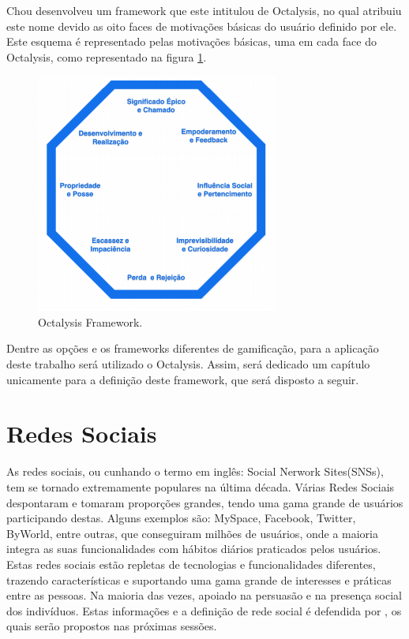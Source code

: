 Chou desenvolveu um framework que este intitulou de Octalysis, no qual atribuiu
este nome devido as oito faces de motivações básicas do usuário definido por ele.
Este esquema é representado pelas motivações básicas, uma em cada face do Octalysis,
como representado na figura \ref{fig:octalysisex}.

\begin{figure}[h]
    \centering
    \includegraphics[width=300px, scale=1]{figuras/octalysisex}
    \caption{Octalysis Framework.}
    \label{fig:octalysisex}
\end{figure}

Dentre as opções e os frameworks diferentes de gamificação, para a aplicação
deste trabalho será utilizado o Octalysis. Assim, será dedicado um capítulo
unicamente para a definição deste framework, que será disposto a seguir.



\section{Redes Sociais}
\label{sec:redessociais}
As redes sociais, ou cunhando o termo em inglês: Social Nerwork Sites(SNSs),
tem se tornado extremamente populares na última década. 
Várias
Redes Sociais despontaram e tomaram proporções grandes, tendo uma gama grande
de usuários participando destas. Alguns exemplos são: MySpace, Facebook, Twitter,
ByWorld, entre outras, que conseguiram milhões de usuários, onde a maioria integra
as suas funcionalidades com hábitos diários praticados pelos usuários.
Estas redes sociais estão repletas de tecnologias e funcionalidades diferentes,
trazendo características e suportando uma gama grande de interesses e práticas
entre as pessoas. Na maioria das vezes, apoiado na persuasão e na presença social
dos indivíduos. Estas informações e a definição de rede social é defendida por
\cite{socialnetworkdefinition}, os quais serão propostos nas próximas sessões.
